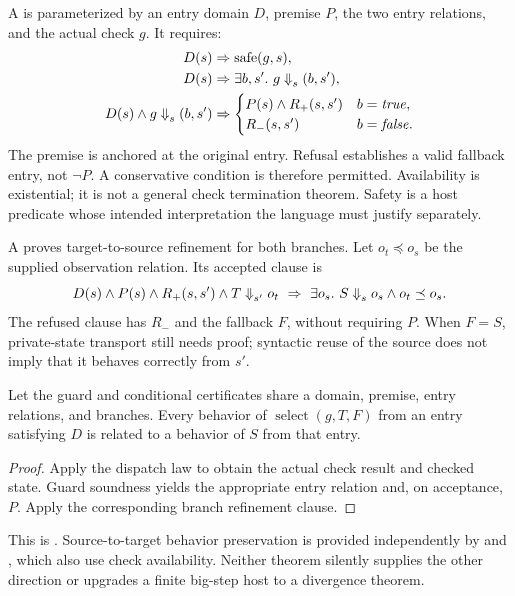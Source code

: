A  is parameterized by an entry domain $D$, premise $P$,
the two entry relations, and the actual check $g$. It requires:
\begin{align}
D(s)&\Rightarrow\operatorname{safe}(g,s),\label{eq:safety}\\
D(s)&\Rightarrow\exists b,s'.\ \checkrun{g}{s}{(b,s')},\label{eq:available}\\
D(s)\land\checkrun{g}{s}{(b,s')}&\Rightarrow
\begin{cases}P(s)\land R_+(s,s')&b=\mathit{true},\\R_-(s,s')&b=\mathit{false}.
\end{cases}\label{eq:sound}
\end{align}
The premise is anchored at the original entry. Refusal establishes a valid
fallback entry, not $\neg P$. A conservative condition is therefore permitted.
Availability is existential; it is not a general check termination theorem.
Safety is a host predicate whose intended interpretation the language must
justify separately.

A  proves target-to-source refinement for both
branches. Let $o_t\preceq o_s$ be the supplied observation relation. Its accepted
clause is
\begin{equation}
D(s)\land P(s)\land R_+(s,s')\land T\mathrel{\Downarrow}_{s'}o_t
\ \Rightarrow\ \exists o_s.\ S\mathrel{\Downarrow}_{s}o_s\land o_t\preceq o_s.
\label{eq:conditional}
\end{equation}
The refused clause has $R_-$ and the fallback $F$, without requiring $P$.
When $F=S$, private-state transport still needs proof; syntactic reuse of the
source does not imply that it behaves correctly from $s'$.

\begin{theorem}
Let the guard and conditional certificates share a domain, premise, entry
relations, and branches. Every behavior of
$\operatorname{select}(g,T,F)$ from an entry satisfying $D$ is related to a
behavior of $S$ from that entry.
\end{theorem}
\begin{proof}
Apply the dispatch law to obtain the actual check result and checked state.
Guard soundness yields the appropriate entry relation and, on acceptance, $P$.
Apply the corresponding branch refinement clause.
\end{proof}
This is . Source-to-target behavior preservation is
provided independently by  and
, which also use check availability. Neither theorem
silently supplies the other direction or upgrades a finite big-step host to a
divergence theorem.

